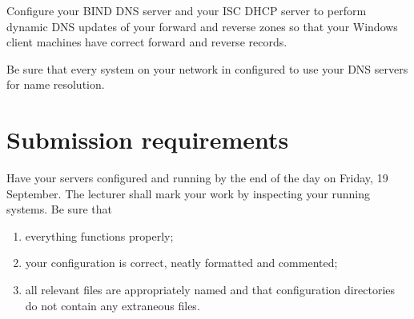 \documentclass{article}
\begin{document}
Configure your BIND DNS server and your ISC DHCP server to perform dynamic DNS updates of your forward and reverse zones so that your Windows client machines have correct forward and reverse records.

Be sure that every system on your network in configured to use your DNS servers for name resolution.

\section{Submission requirements}
Have your servers configured and running by the end of the day on Friday, 19 September.  The lecturer shall mark your work by inspecting your running systems. Be sure that 
  \begin{enumerate}
    \item everything functions properly;
    \item your configuration is correct, neatly formatted and commented;
    \item all relevant files are appropriately named and that configuration 
          directories do not contain any extraneous files.
  \end{enumerate}
\end{document}
